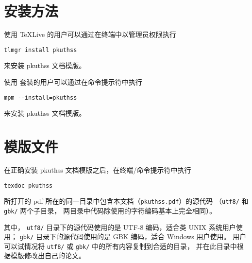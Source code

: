 	\section{安装方法}\label{sec:inst}

	使用 \TeX{}Live 的用户可以通过在终端中以管理员权限执行
\begin{Verbatim}[frame = single]
tlmgr install pkuthss
\end{Verbatim}
	来安装 pkuthss 文档模版。

	使用 \CTeX{} 套装的用户可以通过在命令提示符中执行
\begin{Verbatim}[frame = single]
mpm --install=pkuthss
\end{Verbatim}
	来安装 pkuthss 文档模版。

	\section{模版文件}\label{sec:doc-dir}

	在正确安装 pkuthss 文档模版之后，在终端/命令提示符中执行
\begin{Verbatim}[frame = single]
texdoc pkuthss
\end{Verbatim}
	所打开的 pdf 所在的同一目录中包含本文档（\verb|pkuthss.pdf|）的源代码%
	（\verb|utf8/| 和 \verb|gbk/| 两个子目录，
	两目录中代码除使用的字符编码基本上完全相同）。

	其中，%
	\verb|utf8/| 目录下的源代码使用的是 UTF-8 编码，适合类 UNIX 系统用户使用；%
	\verb|gbk/| 目录下的源代码使用的是 GBK 编码，适合 Windows 用户使用。%
	用户可以试情况将 \verb|utf8/| 或 \verb|gbk/| 中的所有内容复制到合适的目录，
	并在此目录中根据模版修改出自己的论文。


